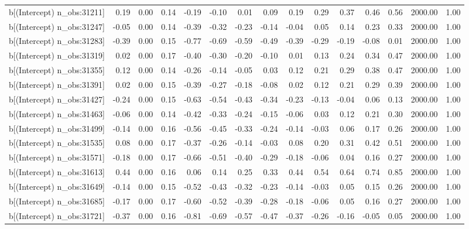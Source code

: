 \begin{table}[ht]
\begin{tabular}{rrrrrrrrrrrrrrr}
  b[(Intercept) n\_obs:31211] & 0.19 & 0.00 & 0.14 & -0.19 & -0.10 & 0.01 & 0.09 & 0.19 & 0.29 & 0.37 & 0.46 & 0.56 & 2000.00 & 1.00 \\ 
  b[(Intercept) n\_obs:31247] & -0.05 & 0.00 & 0.14 & -0.39 & -0.32 & -0.23 & -0.14 & -0.04 & 0.05 & 0.14 & 0.23 & 0.33 & 2000.00 & 1.00 \\ 
  b[(Intercept) n\_obs:31283] & -0.39 & 0.00 & 0.15 & -0.77 & -0.69 & -0.59 & -0.49 & -0.39 & -0.29 & -0.19 & -0.08 & 0.01 & 2000.00 & 1.00 \\ 
  b[(Intercept) n\_obs:31319] & 0.02 & 0.00 & 0.17 & -0.40 & -0.30 & -0.20 & -0.10 & 0.01 & 0.13 & 0.24 & 0.34 & 0.47 & 2000.00 & 1.00 \\ 
  b[(Intercept) n\_obs:31355] & 0.12 & 0.00 & 0.14 & -0.26 & -0.14 & -0.05 & 0.03 & 0.12 & 0.21 & 0.29 & 0.38 & 0.47 & 2000.00 & 1.00 \\ 
  b[(Intercept) n\_obs:31391] & 0.02 & 0.00 & 0.15 & -0.39 & -0.27 & -0.18 & -0.08 & 0.02 & 0.12 & 0.21 & 0.29 & 0.39 & 2000.00 & 1.00 \\ 
  b[(Intercept) n\_obs:31427] & -0.24 & 0.00 & 0.15 & -0.63 & -0.54 & -0.43 & -0.34 & -0.23 & -0.13 & -0.04 & 0.06 & 0.13 & 2000.00 & 1.00 \\ 
  b[(Intercept) n\_obs:31463] & -0.06 & 0.00 & 0.14 & -0.42 & -0.33 & -0.24 & -0.15 & -0.06 & 0.03 & 0.12 & 0.21 & 0.30 & 2000.00 & 1.00 \\ 
  b[(Intercept) n\_obs:31499] & -0.14 & 0.00 & 0.16 & -0.56 & -0.45 & -0.33 & -0.24 & -0.14 & -0.03 & 0.06 & 0.17 & 0.26 & 2000.00 & 1.00 \\ 
  b[(Intercept) n\_obs:31535] & 0.08 & 0.00 & 0.17 & -0.37 & -0.26 & -0.14 & -0.03 & 0.08 & 0.20 & 0.31 & 0.42 & 0.51 & 2000.00 & 1.00 \\ 
  b[(Intercept) n\_obs:31571] & -0.18 & 0.00 & 0.17 & -0.66 & -0.51 & -0.40 & -0.29 & -0.18 & -0.06 & 0.04 & 0.16 & 0.27 & 2000.00 & 1.00 \\ 
  b[(Intercept) n\_obs:31613] & 0.44 & 0.00 & 0.16 & 0.06 & 0.14 & 0.25 & 0.33 & 0.44 & 0.54 & 0.64 & 0.74 & 0.85 & 2000.00 & 1.00 \\ 
  b[(Intercept) n\_obs:31649] & -0.14 & 0.00 & 0.15 & -0.52 & -0.43 & -0.32 & -0.23 & -0.14 & -0.03 & 0.05 & 0.15 & 0.26 & 2000.00 & 1.00 \\ 
  b[(Intercept) n\_obs:31685] & -0.17 & 0.00 & 0.17 & -0.60 & -0.52 & -0.39 & -0.28 & -0.18 & -0.06 & 0.05 & 0.16 & 0.27 & 2000.00 & 1.00 \\ 
  b[(Intercept) n\_obs:31721] & -0.37 & 0.00 & 0.16 & -0.81 & -0.69 & -0.57 & -0.47 & -0.37 & -0.26 & -0.16 & -0.05 & 0.05 & 2000.00 & 1.00 \\ 

\end{tabular}
\end{table}
